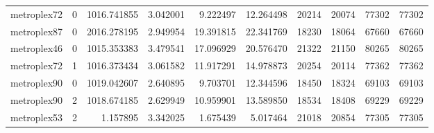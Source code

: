 \begin{longtable}{|l|r|r|r|r|r|r|r|r|r|}
metroplex72 & 0 & 1016.741855 & 3.042001 & 9.222497 & 12.264498 & 20214 & 20074 & 77302 & 77302 \\
metroplex87 & 0 & 2016.278195 & 2.949954 & 19.391815 & 22.341769 & 18230 & 18064 & 67660 & 67660 \\
metroplex46 & 0 & 1015.353383 & 3.479541 & 17.096929 & 20.576470 & 21322 & 21150 & 80265 & 80265 \\
metroplex72 & 1 & 1016.373434 & 3.061582 & 11.917291 & 14.978873 & 20254 & 20114 & 77362 & 77362 \\
metroplex90 & 0 & 1019.042607 & 2.640895 & 9.703701 & 12.344596 & 18450 & 18324 & 69103 & 69103 \\
metroplex90 & 2 & 1018.674185 & 2.629949 & 10.959901 & 13.589850 & 18534 & 18408 & 69229 & 69229 \\
metroplex53 & 2 & 1.157895 & 3.342025 & 1.675439 & 5.017464 & 21018 & 20854 & 77305 & 77305 \\
\end{longtable}
